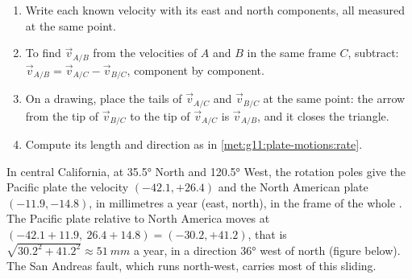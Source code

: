 \begin{method}\label{met:g11:plate-motions:triangle}
\begin{enumerate}
  \item Write each known velocity with its east and north components, all
        measured at the same point.
  \item To find $\vec v_{A/B}$ from the velocities of $A$ and $B$ in the same
        frame $C$, subtract: $\vec v_{A/B} = \vec v_{A/C} - \vec v_{B/C}$,
        component by component.
  \item On a drawing, place the tails of $\vec v_{A/C}$ and $\vec v_{B/C}$ at
        the same point: the arrow from the tip of $\vec v_{B/C}$ to the tip of
        $\vec v_{A/C}$ is $\vec v_{A/B}$, and it closes the triangle.
  \item Compute its length and direction as in
        \cref{met:g11:plate-motions:rate}.
\end{enumerate}
\end{method}

\begin{example}\label{ex:g11:plate-motions:san-andreas}
In central California, at \ang{35.5} North and \ang{120.5} West, the rotation
poles give the Pacific plate the velocity $(-42.1, +26.4)$ and the North
American plate $(-11.9, -14.8)$, in millimetres a year (east, north), in the
frame of the whole . The Pacific plate relative to North America
moves at $(-42.1 + 11.9,\ 26.4 + 14.8) = (-30.2, +41.2)$, that is
$\sqrt{30.2^2 + 41.2^2} \approx \qty{51}{mm}$ a year, in a direction
\ang{36} west of north (figure below). The San
Andreas fault, which runs north-west, carries most of this sliding.
\end{example}

